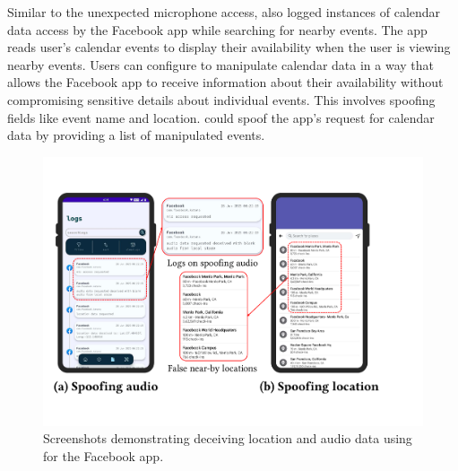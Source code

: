 Similar to the unexpected microphone access, \framework{}
also logged instances of calendar data access by the Facebook app while
searching for nearby events. The app reads user's calendar events to display their
availability when the user is viewing nearby events.  
Users can configure \framework to manipulate calendar data in a way that allows
the Facebook app to receive information about their availability without
compromising sensitive details about individual events. This involves spoofing
fields like event name and location. 
\framework could spoof the app's request for calendar data by providing a list
of manipulated events.

\begin{figure}[t]
    \centering
    \includegraphics[width=\linewidth]{Figures/Case Studies/facebook_screenshots.pdf}
    \caption{Screenshots demonstrating deceiving location and audio data using \framework{} for the Facebook app.}
    \label{fig:case-study-facebook}
\end{figure}


